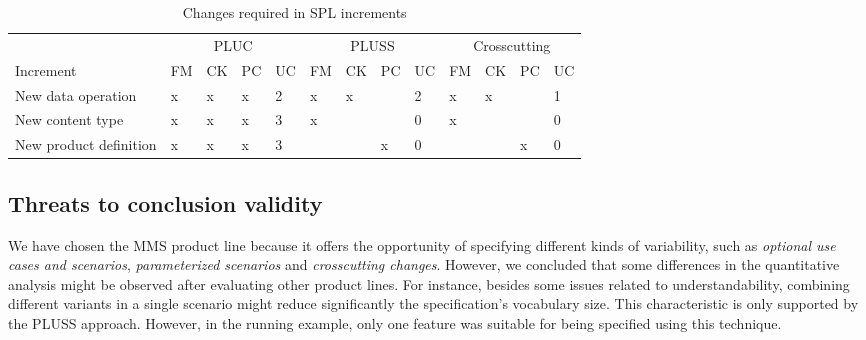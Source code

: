 \documentclass{acm_proc_article-sp}
\begin{document}
\begin{table*}[t]
\centering
\caption{Changes required in SPL increments}
\label{tab:incremental-results}
\begin{small}
\begin{tabular}{l|llll|llll|llll} \hline
& \multicolumn{4}{|c|}{PLUC} & \multicolumn{4}{|c|}{PLUSS}  & \multicolumn{4}{|c}{Crosscutting} \\
Increment 			& FM 	& CK   & PC & UC	& FM 	& CK & PC 	& UC 	& FM 	& CK & PC 	& UC  	\\ \hline
New data operation  	& x		& x	   & x    &	2	& x 		& x 	 & 		& 2		& x		& x	 & 		& 1		\\ 
New content type      	& x 		& x	   & x	    &	3	& x		&	 & 		& 0		& x		& 	 &		& 0		\\
New product definition 	& x 		& x	   & x	    &	3	& 		& 	 & x	 	& 0		& 		& 	 & x		& 0		\\ \hline
\end{tabular}
\end{small}
\end{table*}
  
\subsection{Threats to conclusion validity}
\label{threats}

We have chosen the MMS product line because it offers the opportunity of specifying different kinds 
of variability, such as \emph{optional use cases and scenarios}, \emph{parameterized scenarios} and 
\emph{crosscutting changes}. However, we concluded that some differences in the quantitative 
analysis might be observed after evaluating other product lines. For instance, besides some issues related 
to understandability, combining different variants in a single scenario might reduce significantly the  
specification's vocabulary size. This characteristic is only supported by the PLUSS approach. However, in 
the running example, only one feature was suitable for being specified using this technique.  

\end{document}
